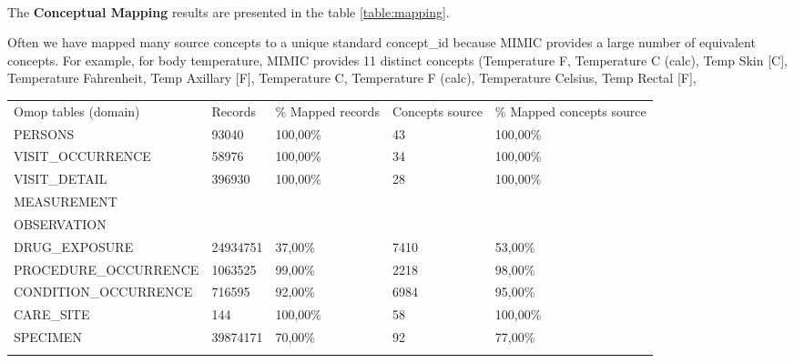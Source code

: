 ~
\\


The \textbf{Conceptual Mapping} results are presented in the table
\ref{table:mapping}. 

Often we have mapped many source concepts to a unique standard concept\_id
because MIMIC provides a large number of equivalent concepts. For example, for
body temperature, MIMIC provides 11 distinct concepts (Temperature F,
Temperature C (calc), Temp Skin [C], Temperature Fahrenheit, Temp Axillary [F],
Temperature C, Temperature F (calc), Temperature Celsius, Temp Rectal [F], 


\begin{table*}[t]
\caption{Terminology Mapping coverage}
\begin{tabular}{@{}lllll@{}}\toprule
Omop tables (domain)   & Records 	& \% Mapped records  & Concepts source 		& \% Mapped concepts source  \\\colrule
PERSONS                & 93040          & 100,00\%            & 43                      & 100,00\%                     \\
VISIT\_OCCURRENCE      & 58976          & 100,00\%            & 34                      & 100,00\%                     \\
VISIT\_DETAIL          & 396930         & 100,00\%            & 28                      & 100,00\%                     \\
MEASUREMENT            &                &                     &                         &                              \\
OBSERVATION            &                &                     &                         &                              \\
DRUG\_EXPOSURE         & 24934751       & 37,00\%             & 7410                    & 53,00\%                      \\
PROCEDURE\_OCCURRENCE  & 1063525        & 99,00\%             & 2218                    & 98,00\%                      \\
CONDITION\_OCCURRENCE  & 716595         & 92,00\%             & 6984                    & 95,00\%                      \\
CARE\_SITE             & 144            & 100,00\%            & 58                      & 100,00\%                     \\
SPECIMEN               & 39874171       & 70,00\%             & 92                      & 77,00\%                      \\\botrule
\end{tabular}
\label{table:mapping}
\end{table*}

